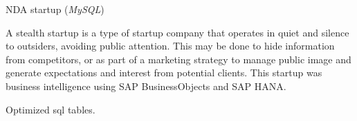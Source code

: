\begin{cventries}
  \cvcustombodydescription
    {NDA startup (\emph{MySQL})}
    {
      \begin{cvtightprose} %
        {A stealth startup is a type of startup company that operates in quiet and silence to outsiders, avoiding public attention. This may be done to hide information from competitors, or as part of a marketing strategy to manage public image and generate expectations and interest from potential clients. This startup was business intelligence using SAP BusinessObjects and SAP HANA.}
      \end{cvtightprose}
    }
    {
      \begin{cvitems} %
        \item {Optimized sql tables.}
      \end{cvitems}
    }

\end{cventries}
